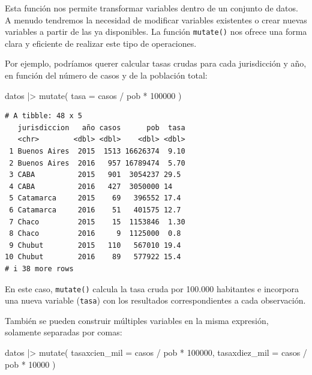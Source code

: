 \documentclass[
  spanish,
  letterpaper,
  DIV=11,
  numbers=noendperiod]{scrreprt}
\newenvironment{Shaded}{\begin{snugshade}}{\end{snugshade}}
\newcommand{\AttributeTok}[1]{\textcolor[rgb]{0.40,0.45,0.13}{#1}}
\newcommand{\DecValTok}[1]{\textcolor[rgb]{0.68,0.00,0.00}{#1}}
\newcommand{\FunctionTok}[1]{\textcolor[rgb]{0.28,0.35,0.67}{#1}}
\newcommand{\NormalTok}[1]{\textcolor[rgb]{0.00,0.23,0.31}{#1}}
\newcommand{\SpecialCharTok}[1]{\textcolor[rgb]{0.37,0.37,0.37}{#1}}
\begin{document}
Esta función nos permite transformar variables dentro de un conjunto de
datos. A menudo tendremos la necesidad de modificar variables existentes
o crear nuevas variables a partir de las ya disponibles. La función
\texttt{mutate()} nos ofrece una forma clara y eficiente de realizar
este tipo de operaciones.

Por ejemplo, podríamos querer calcular tasas crudas para cada
jurisdicción y año, en función del número de casos y de la población
total:

\begin{Shaded}
\begin{Highlighting}[]
\NormalTok{datos }\SpecialCharTok{|\textgreater{}}
  \FunctionTok{mutate}\NormalTok{(}
    \AttributeTok{tasa =}\NormalTok{ casos }\SpecialCharTok{/}\NormalTok{ pob }\SpecialCharTok{*} \DecValTok{100000}
\NormalTok{  )}
\end{Highlighting}
\end{Shaded}

\begin{verbatim}
# A tibble: 48 x 5
   jurisdiccion   año casos      pob  tasa
   <chr>        <dbl> <dbl>    <dbl> <dbl>
 1 Buenos Aires  2015  1513 16626374  9.10
 2 Buenos Aires  2016   957 16789474  5.70
 3 CABA          2015   901  3054237 29.5 
 4 CABA          2016   427  3050000 14   
 5 Catamarca     2015    69   396552 17.4 
 6 Catamarca     2016    51   401575 12.7 
 7 Chaco         2015    15  1153846  1.30
 8 Chaco         2016     9  1125000  0.8 
 9 Chubut        2015   110   567010 19.4 
10 Chubut        2016    89   577922 15.4 
# i 38 more rows
\end{verbatim}

En este caso, \texttt{mutate()} calcula la tasa cruda por 100.000
habitantes e incorpora una nueva variable (\texttt{tasa}) con los
resultados correspondientes a cada observación.

También se pueden construir múltiples variables en la misma expresión,
solamente separadas por comas:

\begin{Shaded}
\begin{Highlighting}[]
\NormalTok{datos }\SpecialCharTok{|\textgreater{}}
  \FunctionTok{mutate}\NormalTok{(}
    \AttributeTok{tasaxcien\_mil =}\NormalTok{ casos }\SpecialCharTok{/}\NormalTok{ pob }\SpecialCharTok{*} \DecValTok{100000}\NormalTok{,}
    \AttributeTok{tasaxdiez\_mil =}\NormalTok{ casos }\SpecialCharTok{/}\NormalTok{ pob }\SpecialCharTok{*} \DecValTok{10000}
\NormalTok{  )}
\end{Highlighting}
\end{Shaded}
\end{document}
